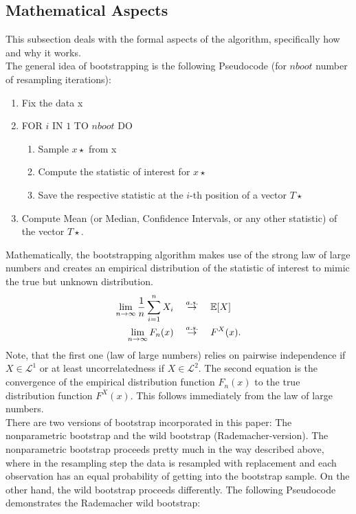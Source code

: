 \subsection{Mathematical Aspects}
This subsection deals with the formal aspects of the algorithm, specifically how and why it works.\\
The general idea of bootstrapping is the following Pseudocode (for $nboot$ number of resampling iterations):
\begin{enumerate}
	\item Fix the data x
	\item FOR $i$ IN $1$ TO $nboot$ DO
	 \begin{enumerate}
		\item Sample $x\star$ from x
		\item Compute the statistic of interest for $x\star$
		\item Save the respective statistic at the $i$-th position of a vector $T\star$
	\end{enumerate}
	\item Compute Mean (or Median, Confidence Intervals, or any other statistic) of the vector $T\star$.
\end{enumerate}
Mathematically, the bootstrapping algorithm makes use of the strong law of large numbers and creates an empirical distribution of the statistic of interest to mimic the true but unknown distribution.
\begin{align*}
	\lim_{n \to \infty} \frac{1}{n}\sum_{i=1}^n X_i \quad &\stackrel{a.s.}{\to} \quad \mathbb{E}[X] \\
	\lim_{n \to \infty} F_n(x) \quad &\stackrel{a.s.}{\to} \quad F^X(x).
\end{align*}
Note, that the first one (law of large numbers) relies on pairwise independence if $X \in \mathcal{L}^1$ or at least uncorrelatedness if $X \in \mathcal{L}^2$. The second equation is the convergence of the empirical distribution function $F_n(x)$ to the true distribution function $F^X(x)$. This follows immediately from the law of large numbers.\\
There are two versions of bootstrap incorporated in this paper: The nonparametric bootstrap and the wild bootstrap (Rademacher-version). The nonparametric bootstrap proceeds pretty much in the way described above, where in the resampling step the data is resampled with replacement and each observation has an equal probability of getting into the bootstrap sample. On the other hand, the wild bootstrap proceeds differently. The following Pseudocode demonstrates the Rademacher wild bootstrap:
